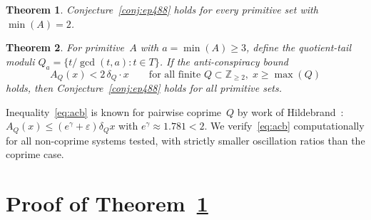 \documentclass[11pt,a4paper]{amsart}
\theoremstyle{plain}
\newtheorem{theorem}{Theorem}[section]
\theoremstyle{definition}
\newcommand{\Z}{\mathbb{Z}}
\begin{document}
\begin{theorem}\label{thm:a2}
Conjecture~\ref{conj:ep488} holds for every primitive set with $\min(A) = 2$.
\end{theorem}

\begin{theorem}\label{thm:reduction}
For primitive~$A$ with $a = \min(A) \geq 3$, define the quotient-tail moduli 
$Q_a = \{t/\gcd(t,a) : t \in T\}$. If the \emph{anti-conspiracy bound}
\begin{equation}\label{eq:acb}
A_Q(x) < 2\,\delta_Q \cdot x \qquad \text{for all finite } Q \subset \Z_{\geq 2},\; x \geq \max(Q)
\end{equation}
holds, then Conjecture~\ref{conj:ep488} holds for all primitive sets.
\end{theorem}

Inequality~\eqref{eq:acb} is known for pairwise coprime~$Q$ by work of 
Hildebrand~\cite{Hi84}: $A_Q(x) \leq (e^\gamma + \varepsilon)\delta_Q x$ 
with $e^\gamma \approx 1.781 < 2$. We verify~\eqref{eq:acb} computationally 
for all non-coprime systems tested, with strictly smaller oscillation ratios 
than the coprime case.

\section{Proof of Theorem~\ref{thm:a2}}
\end{document}
